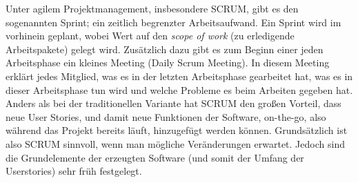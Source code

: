 Unter agilem Projektmanagement, insbesondere SCRUM, gibt es den sogenannten
Sprint; ein zeitlich begrenzter Arbeitsaufwand. Ein Sprint wird im vorhinein geplant, wobei Wert auf den \textit{scope of work} (zu erledigende Arbeitspakete) gelegt wird. 
Zusätzlich dazu gibt es zum Beginn einer jeden
Arbeitsphase ein kleines Meeting (Daily Scrum Meeting). In diesem Meeting erklärt jedes Mitglied, was es in der letzten Arbeitsphase gearbeitet hat, was es in dieser Arbeitsphase tun wird und welche Probleme es beim Arbeiten gegeben hat.
Anders als bei der traditionellen Variante hat SCRUM den großen Vorteil, dass neue User Stories, und damit neue Funktionen der Software, on-the-go, also während das Projekt bereits läuft, hinzugefügt werden können. 
Grundsätzlich ist also SCRUM sinnvoll, wenn man mögliche Veränderungen erwartet. Jedoch sind die Grundelemente der erzeugten Software (und somit der Umfang der Userstories) sehr früh festgelegt.